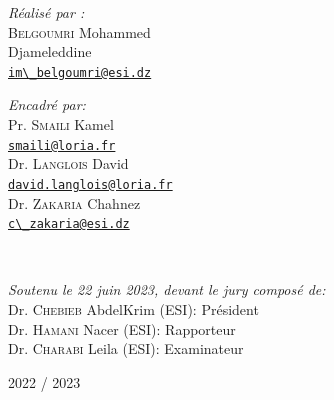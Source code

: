 {\begin{titlepage}
  \vspace{10mm}

  \noindent
  \begin{minipage}{0.6\textwidth}
    \vspace{-7mm}
    \begin{flushleft} \large
      \emph{Réalisé par :}\\
      \textsc{Belgoumri} Mohammed \\Djameleddine\\
      \href{mailto:im_belgoumri@esi.dz}{\verb!im\_belgoumri@esi.dz!}  
    \end{flushleft}
  \end{minipage}
  \begin{minipage}{0.35\textwidth}
    \begin{flushright} \large
      \begin{flushleft} \large
      \emph{Encadré par:} \\
      {
        Pr. \textsc{Smaili} Kamel\\[0.1cm]
        \href{mailto:smaili@loria.fr}{\verb!smaili@loria.fr!}\\[0.1cm]
        Dr. \textsc{Langlois} David\\[0.1cm]
        \href{mailto:david.langlois@loria.fr}{\verb!david.langlois@loria.fr!}\\[0.1cm]
        Dr. \textsc{Zakaria} Chahnez\\[0.1cm]
        \href{mailto:c_zakaria@esi.dz}{\verb!c\_zakaria@esi.dz!}\\
      }
      \end{flushleft}
    \end{flushright}
  \end{minipage}\\[1cm]

  \begin{minipage}{.7\linewidth}
    \begin{center}
      \begin{flushleft}
        \emph{Soutenu le 22 juin 2023, devant le jury composé de:}\\
        Dr. \textsc{Chebieb} AbdelKrim (ESI): Président\\
        Dr. \textsc{Hamani} Nacer (ESI): Rapporteur\\
        Dr. \textsc{Charabi} Leila (ESI): Examinateur\\
      \end{flushleft}
    \end{center}
  \end{minipage}
  
  \vfill

  {\large 2022 / 2023}        
\end{titlepage}
\restoregeometry
}